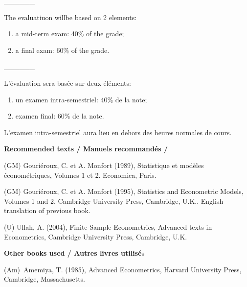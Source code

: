 \documentclass[titlepage,11pt,amstex]{article}
\begin{document}
\begin{center}
\_\_\_\_\_\_
\end{center}

\newpage 

The evaluatiuon willbe based on 2 elements:

\begin{enumerate}
\item a mid-term exam: 40\% of the grade;

\item a final exam: 60\% of the grade.
\end{enumerate}

\begin{center}
\_\_\_\_\_\_
\end{center}

L'\'{e}valuation sera bas\'{e}e sur deux \'{e}l\'{e}ments:

\begin{enumerate}
\item un examen intra-semestriel: 40\% de la note;

\item examen final: 60\% de la note.
\end{enumerate}

\noindent L'examen intra-semestriel aura lieu en dehors des heures normales
de cours.

\quad

\begin{center}
\textbf{Recommended texts / Manuels recommand\'{e}s / }

\quad
\end{center}

(GM) Gouri\'{e}roux, C. et A. Monfort (1989), Statistique et mod\`{e}les 
\'{e}conom\'{e}triques, Volumes 1 et 2. Economica, Paris.

(GM) Gouri\'{e}roux, C. et A. Monfort (1995), Statistics and Econometric
Models, Volumes 1 and 2. Cambridge University Press, Cambridge, U.K..
English translation of previous book.

(U) Ullah, A. (2004), Finite Sample Econometrics, Advanced texts in
Econometrics, Cambridge University Press, Cambridge, U.K.

\quad

\begin{center}
\textbf{Other books used / Autres livres utilis\'{e}}s

\quad
\end{center}

(Am)\ Amemiya, T. (1985), Advanced Econometrics, Harvard University Press,
Cambridge, Massachusetts.
\end{document}
